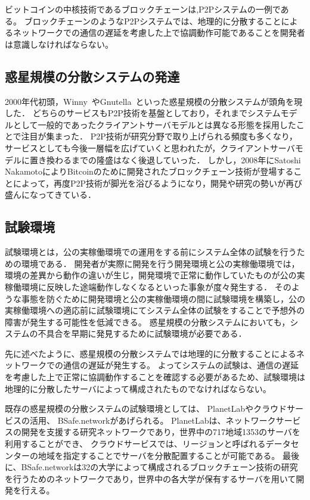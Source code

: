 ビットコインの中核技術であるブロックチェーンは,P2Pシステムの一例である。
ブロックチェーンのようなP2Pシステムでは、地理的に分散することによるネットワークでの通信の遅延を考慮した上で協調動作可能であることを開発者は意識しなければならない。

\subsection{惑星規模の分散システムの発達}

2000年代初頭，Winny~\cite{Winny}やGnutella~\cite{Gnutella}といった惑星規模の分散システムが頭角を現した．
どちらのサービスもP2P技術を基盤としており，それまでシステムモデルとして一般的であったクライアントサーバモデルとは異なる形態を採用したことで注目が集まった．
P2P技術が研究分野で取り上げられる頻度も多くなり，サービスとしても今後一層幅を広げていくと思われたが，クライアントサーバモデルに置き換わるまでの隆盛はなく後退していった．
しかし，2008年にSatoshi NakamotoによりBitcoinのために開発されたブロックチェーン技術が登場することによって，再度P2P技術が脚光を浴びるようになり，開発や研究の勢いが再び盛んになってきている．

\subsection{試験環境}

試験環境とは，公の実稼働環境での運用をする前にシステム全体の試験を行うための環境である．
開発者が実際に開発を行う開発環境と公の実稼働環境では，環境の差異から動作の違いが生じ，開発環境で正常に動作していたものが公の実稼働環境に反映した途端動作しなくなるといった事象が度々発生する．
そのような事態を防ぐために開発環境と公の実稼働環境の間に試験環境を構築し，公の実稼働環境への適応前に試験環境にてシステム全体の試験をすることで予想外の障害が発生する可能性を低減できる。
惑星規模の分散システムにおいても，システムの不具合を早期に発見するために試験環境が必要である．

先に述べたように、惑星規模の分散システムでは地理的に分散することによるネットワークでの通信の遅延が発生する。
よってシステムの試験は、通信の遅延を考慮した上で正常に協調動作することを確認する必要があるため、試験環境は地理的に分散したサーバによって構成されたものでなければならない。

既存の惑星規模の分散システムの試験環境としては、 PlanetLabやクラウドサービスの活用、 BSafe.networkがあげられる。
PlanetLabは、ネットワークサービスの開発を支援する研究ネットワークであり，世界中の717地域1353のサーバを利用することができ、
クラウドサービスでは、リージョンと呼ばれるデータセンターの地域を指定することでサーバを分散配置することが可能である。
最後に、BSafe.networkは32の大学によって構成されるブロックチェーン技術の研究を行うためのネットワークであり，世界中の各大学が保有するサーバを用いて開発を行える。

